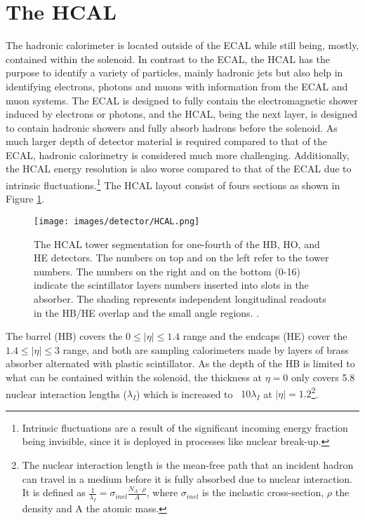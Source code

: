 \section{The HCAL}
\noindent\justify
The hadronic calorimeter is located outside of the ECAL while still being, mostly, contained within the solenoid.
In contrast to the ECAL, the HCAL has the purpose to identify a variety of particles, mainly hadronic jets but also help in identifying electrons, photons and muons with information from the ECAL and muon systems. 
The ECAL is designed to fully contain the electromagnetic shower induced by electrons or photons, and the HCAL, being the next layer, is designed to contain hadronic showers and fully absorb hadrons before the solenoid. 
As much larger depth of detector material is required compared to that of the ECAL, hadronic calorimetry is considered much more challenging. 
Additionally, the HCAL energy resolution is also worse compared to that of the ECAL due to intrinsic fluctuations.\footnote{Intrinsic fluctuations are a result of the significant incoming energy fraction being invisible, since it is deployed in processes like nuclear break-up.}
\newpara
\noindent\justify
The HCAL layout consist of fours sections as shown in Figure \ref{fig:HCAL}. 
\begin{figure}[!htp]
  \centering
   \texttt{[image: images/detector/HCAL.png]}
   \caption{The HCAL tower segmentation for one-fourth of the HB, HO, and HE detectors. The numbers on top and on the left refer to the tower numbers. The numbers on the right and on the bottom (0-16) indicate the scintillator layers numbers inserted into slots in the absorber. The shading represents independent longitudinal readouts in the HB/HE overlap and the small angle regions. \cite{Baiatian:2007xva}.}
   \label{fig:HCAL}
\end{figure}                                                                                            
The barrel (HB) covers the $0\leq|\eta|\leq1.4$ range and the endcaps (HE) cover the $1.4\leq|\eta|\leq3$ range, and both are sampling calorimeters made by layers of brass absorber alternated with plastic scintillator. 
As the depth of the HB is limited to what can be contained within the solenoid, the thickness at $\eta=0$ only covers 5.8 nuclear interaction lengths ($\lambda_{I}$) which is increased to ~$10\lambda_{I}$ at $|\eta|=1.2$\footnote{The nuclear interaction length is the mean-free path that an incident hadron can travel in a medium before it is fully absorbed due to nuclear interaction. It is defined as $\frac{1}{\lambda_{I}}=\sigma_{inel}\frac{N_{A}\cdot\rho}{A}$, where $\sigma_{inel}$ is the inelastic cross-section, $\rho$ the density and A the atomic mass.}. 
